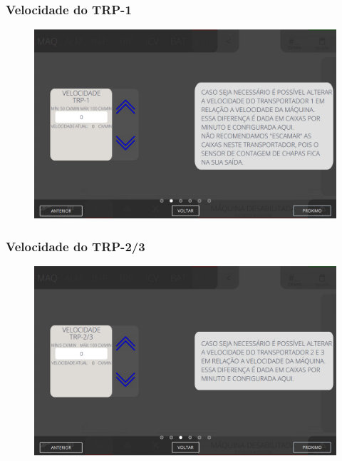 \newpage
\thispagestyle{fancy}
\vspace*{40 pt}
\subsubsection{\small{Velocidade do TRP-1}} \label{sec:telaAjustesEmpilhadorVelocidadeTRP1}
\vspace*{\fill}
\begin{figure}[h]
    \centering
    \includegraphics[width=576 px,height=360 px]{src/imagesICV/08-stacker/settings/2.png}
\end{figure}
\vspace*{\fill}

\newpage
\thispagestyle{fancy}
\vspace*{40 pt}
\subsubsection{\small{Velocidade do TRP-2/3}} \label{sec:telaAjustesEmpilhadorVelocidadeTRP23}
\vspace*{\fill}
\begin{figure}[h]
    \centering
    \includegraphics[width=576 px,height=360 px]{src/imagesICV/08-stacker/settings/3.png}
\end{figure}
\vspace*{\fill}

